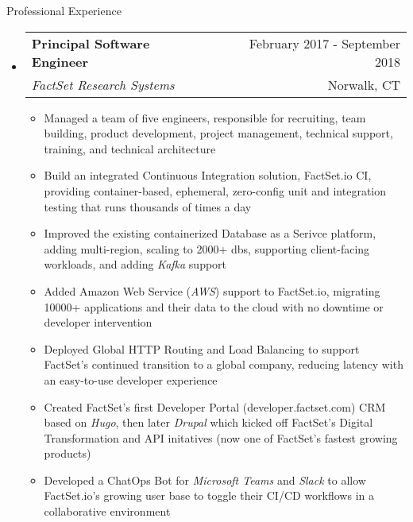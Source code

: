 \documentclass[letterpaper,10pt]{article}
\makeatletter
\newenvironment{ressection}[1]{
	\vspace{4pt}
	{\fontfamily{phv}\selectfont\Large#1}
	\begin{itemize}
	\vspace{3pt}
}{
	\end{itemize}
}
\newcommand{\ressubitem}[1]{
	\vspace{-1pt}
	\item \begin{flushleft} #1 \end{flushleft}
}
\newcommand{\resbigitem}[4]{
	\vspace{-5pt}
	\item
	\begin{tabular*}{6in}{l@{\extracolsep{\fill}}r}
		\textbf{#1} & #2 \\
		\textit{#3} & #4\\
	\end{tabular*}
}
\newenvironment{ressubsec}[4]{
	\resbigitem{#1}{#2}{#3}{#4}
	\vspace{-2pt}
	\begin{itemize}
}{
	\end{itemize}
}
\makeatother
\begin{document}
\begin{ressection}{Professional Experience}
	\begin{ressubsec}{Principal Software Engineer}{February 2017 - September 2018}{FactSet Research Systems}{Norwalk, CT}
		\ressubitem{Managed a team of five engineers, responsible for recruiting, team building, product development, project management, technical support, training, and technical architecture}
		\ressubitem{Build an integrated Continuous Integration solution, FactSet.io CI, providing container-based, ephemeral, zero-config unit and integration testing that runs thousands of times a day}
		\ressubitem{Improved the existing containerized Database as a Serivce platform, adding multi-region, scaling to 2000+ dbs, supporting client-facing workloads, and adding \textit{Kafka} support}
		\ressubitem{Added Amazon Web Service (\textit{AWS}) support to FactSet.io, migrating 10000+ applications and their data to the cloud with no downtime or developer intervention}
		\ressubitem{Deployed Global HTTP Routing and Load Balancing to support FactSet's continued transition to a global company, reducing latency with an easy-to-use developer experience}
		\ressubitem{Created FactSet's first Developer Portal (developer.factset.com) CRM based on \textit{Hugo}, then later \textit{Drupal} which kicked off FactSet's Digital Transformation and API initatives (now one of FactSet's fastest growing products)}
		\ressubitem{Developed a ChatOps Bot for \textit{Microsoft Teams} and \textit{Slack} to allow FactSet.io's growing user base to toggle their CI/CD workflows in a collaborative environment}
	\end{ressubsec}


\end{ressection}
\end{document}
